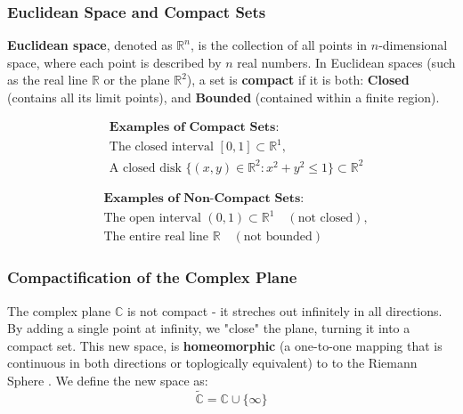 \documentclass[a4paper, 10pt ]{article} %
\theoremstyle{definition}
\theoremstyle{plain}
\begin{document}
\subsubsection{Euclidean Space and Compact Sets}
\textbf{Euclidean space}, denoted as \(\mathbb{R}^n\), is the collection of all points in \(n\)-dimensional space, where each point is described by \(n\) real numbers. In Euclidean spaces (such as the real line \(\mathbb{R}\) or the plane \(\mathbb{R}^2\)), a set is \textbf{compact} if it is both: \textbf{Closed} (contains all its limit points), and \textbf{Bounded} (contained within a finite region).

\begin{minipage}{0.47\textwidth}
  \begin{align*}
     & \textbf{Examples of Compact Sets:}                                                       \\
     & \text{The closed interval } [0,1] \subset \mathbb{R}^1,                                  \\
     & \text{A closed disk } \{(x,y) \in \mathbb{R}^2 : x^2 + y^2 \leq 1\} \subset \mathbb{R}^2
  \end{align*}
\end{minipage}\hfill
\begin{minipage}{0.47\textwidth}
  \begin{align*}
     & \textbf{Examples of Non-Compact Sets:}                                          \\
     & \text{The open interval } (0,1) \subset \mathbb{R}^1 \quad (\text{not closed}), \\
     & \text{The entire real line } \mathbb{R} \quad (\text{not bounded})
  \end{align*}
\end{minipage}

\subsubsection{Compactification of the Complex Plane}
The complex plane $\mathbb{C}$ is not compact - it streches out infinitely in all directions. By adding a single point at infinity, we "close" the plane, turning it into a compact set. This new space, is \textbf{homeomorphic} (a one-to-one mapping that is continuous in both directions or toplogically equivalent) to  to the Riemann Sphere . We define the new space as:
$$\tilde{\mathbb{C}} = \mathbb{C} \cup \{\infty\}$$
\end{document}
